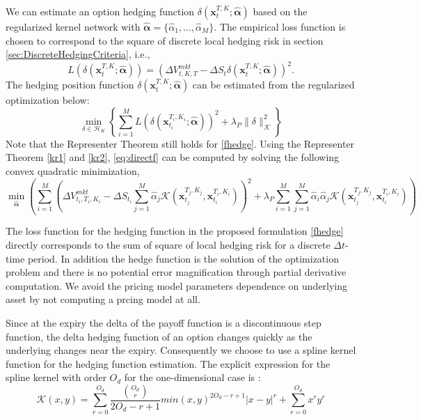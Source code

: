 \documentclass[letterpaper,12pt,titlepage,oneside,final]{book}
\numberwithin{equation}{section}
\theoremstyle{definition}
\newcommand{\vx}{\mathbf{x}}
\newcommand{\HK}{\mathcal{H}_K}
\newcommand{\DS}{\Delta S}
\newcommand{\DT}{\Delta t}
\newcommand{\valpha}{\pmb{\widehat{\alpha}}}
\newcommand{\Vmkt}{V^{mkt}}
\begin{document}
We can estimate an option hedging function $\delta(\vx_{t}^{T,K};\mathbf{\valpha})$ based on the regularized kernel network with $\valpha=\{\widehat{\alpha}_1,\dots,\widehat{\alpha}_M\}$. The empirical loss function is chosen to correspond to the square of discrete local hedging risk in section \ref{sec:DiscreteHedgingCriteria}, i.e., 
\begin{equation}\label{eq:HR}
L\left(\delta(\vx_{t}^{T,K};\valpha)\right)=\left(\Delta V^{mkt}_{t,K,T}-\DS_{t} \delta(\vx_{t}^{T,K};\valpha)\right)^2.
\end{equation}
The hedging position function $\delta(\vx_{t}^{T,K};\valpha)$  can be estimated from  the regularized optimization below:
\begin{equation} \label{fhedge}
\min_{\delta \in \HK}\left\{\sum_{i=1}^M L\left(\delta(\vx_{t_i}^{T_i,K_i};\valpha)\right)^2+\lambda_P \|\delta\|^2_\mathcal{K}\right\}
\end{equation}
Note that the Representer Theorem still holds for \eqref{fhedge}.
Using the Representer Theorem \eqref{kr1} and \eqref{kr2}, \eqref{eq:directf} can be computed by solving the following convex quadratic minimization,
\begin{equation}
	\min_{\mathbf{\valpha}} \left(  \sum_{i=1}^M \left( \Delta \Vmkt_{t_i,T_i,K_i}-\Delta S_{t_i} \sum_{j=1}^M \widehat{\alpha}_j \mathcal{K}(\vx_{t_j}^{T_j,K_j},\vx_{t_i}^{T_i,K_i}) \right)^2+\lambda_P \sum_{i=1}^M\sum_{j=1}^M  \widehat{\alpha}_i \widehat{\alpha}_j \mathcal{K}(\vx_{t_j}^{T_j,K_j},\vx_{t_i}^{T_i,K_i})\right)
	\label{eq:directf}
\end{equation}


The loss function for the hedging function in the proposed formulation \eqref{fhedge}
directly corresponds to the sum of square of local hedging risk for a discrete $\DT$-time period. In addition the hedge function is the solution of the optimization problem  and there is no potential error magnification through partial derivative computation. We avoid the pricing model parameters dependence on underlying asset by not computing a prcing model at all.




Since at the expiry the delta of the payoff function is a discontinuous step function, the  delta hedging function of an option changes quickly as the underlying changes near the expiry.
Consequently we choose to use a spline kernel function \citep{vapnik1998statistical} for the hedging function estimation.
The explicit expression for the spline kernel with order $O_d$  for the one-dimensional case is :
\[
\mathcal{K}(x,y)=\sum_{r=0}^{O_d} \frac{\binom{O_d}{r}}{2 O_d-r+1} min(x,y)^{2 O_d-r+1}|x-y|^r +\sum_{r=0}^{O_d} x^ry^r
\]
\end{document}
